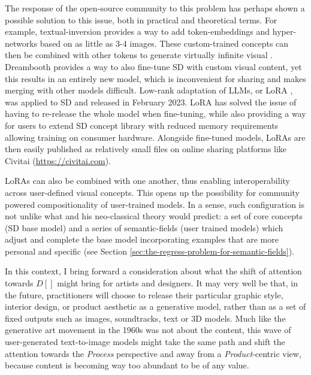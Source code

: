 The response of the open-source community to this problem has perhaps shown a possible solution to this issue, both in practical and theoretical terms. For example, textual-inversion \citep{Gal2022} provides a way to add token-embeddings and hyper-networks based on as little as 3-4 images. These custom-trained concepts can then be combined with other tokens to generate virtually infinite visual . Dreambooth \citep{Ruiz2022} provides a way to also fine-tune SD with custom visual content, yet this results in an entirely new model, which is inconvenient for sharing and makes merging with other models difficult. Low-rank adaptation of LLMs, or LoRA \citep{Hu2021}, was applied to SD and released in February 2023. LoRA has solved the issue of having to re-release the whole model when fine-tuning, while also providing a way for users to extend SD concept library with reduced memory requirements allowing training on consumer hardware. Alongside fine-tuned models, LoRAs are then easily published as relatively small files on online sharing platforms like Civitai (\url{https://civitai.com}).

LoRAs can also be combined with one another, thus enabling interoperability across user-defined visual concepts. This opens up the possibility for community powered compositionality of user-trained models. In a sense, such configuration is not unlike what \cite{Jackendoff1989} and his neo-classical theory would predict: a set of core concepts (SD base model) and a series of semantic-fields (user trained models) which adjust and complete the base model incorporating examples that are more personal and specific (see Section \ref{sec:the-regress-problem-for-semantic-fields}). 

In this context, I bring forward a consideration about what the shift of attention towards $D[]$ might bring for artists and designers. It may very well be that, in the future, practitioners will choose to release their particular graphic style, interior design, or product aesthetic as a generative model, rather than as a set of fixed outputs such as images, soundtracks, text or 3D models. Much like the generative art movement in the 1960s was not about the content, this wave of user-generated text-to-image models might take the same path and shift the attention towards the \emph{Process} perspective and away from a \emph{Product}-centric view, because content is becoming way too abundant to be of any value.

